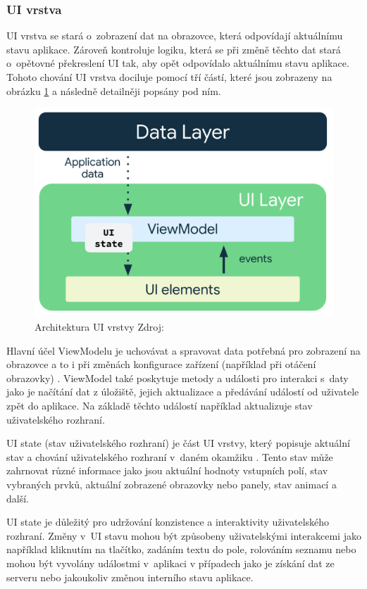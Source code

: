 \subsubsection*{UI vrstva} \label{UILayerNavrh}
UI vrstva se stará o~zobrazení dat na obrazovce, která odpovídají aktuálnímu stavu aplikace. \cite{andDocArch} Zároveň kontroluje logiku, která
se při změně těchto dat stará o~opětovné překreslení UI tak, aby opět odpovídalo aktuálnímu stavu aplikace. Tohoto chování UI vrstva 
dociluje pomocí tří částí, které jsou zobrazeny na obrázku \ref{fig:arch_ui_udf} a následně detailněji popsány pod ním.

\begin{figure}[H]
  \centering
  \includegraphics[width=.5\textwidth]{arch-ui-udf.png}
  \caption{Architektura UI vrstvy Zdroj: \cite{imgDataFlow}}
  \label{fig:arch_ui_udf}
\end{figure}

Hlavní účel ViewModelu je uchovávat a spravovat data potřebná pro zobrazení na obrazovce a to i při změnách konfigurace zařízení 
(například při otáčení obrazovky) \cite{viewModelOver}. ViewModel také poskytuje metody a události pro interakci s~daty jako je načítání dat z úložiště, 
jejich aktualizace a předávání událostí od uživatele zpět do aplikace. Na základě těchto událostí například aktualizuje stav uživatelského
rozhraní. %

 \label{UIStateParagraph}
UI state (stav uživatelského rozhraní) je část UI vrstvy, který popisuje aktuální stav a chování uživatelského 
rozhraní v~daném okamžiku \cite{andDocArch}. Tento stav může zahrnovat různé informace jako jsou aktuální hodnoty vstupních polí, stav vybraných prvků,
 aktuální zobrazené obrazovky nebo panely, stav animací a další.

UI state je důležitý pro udržování konzistence a interaktivity uživatelského rozhraní. Změny v~UI stavu mohou být způsobeny uživatelskými
interakcemi jako například kliknutím na tlačítko, zadáním textu do pole, rolováním seznamu nebo mohou být vyvolány událostmi v~aplikaci v případech 
jako je získání dat ze serveru nebo jakoukoliv změnou interního stavu aplikace. 

